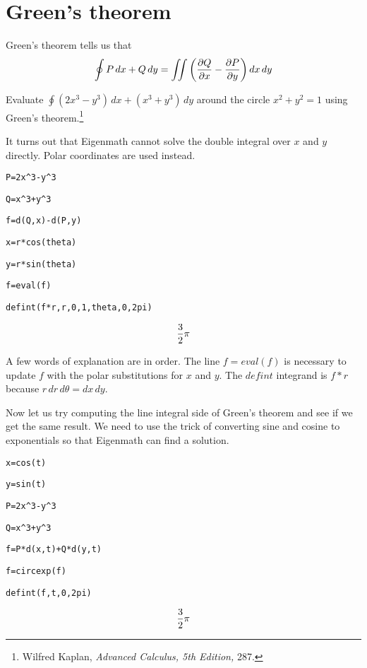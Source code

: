 \section*{Green's theorem}
Green's theorem tells us that
$$\oint P\,dx+Q\,dy=\int\!\!\!\int
\left({\partial Q\over\partial x}-{\partial P\over\partial y}\right)
dx\,dy$$

\noindent
Evaluate $\oint (2x^3-y^3)\,dx+(x^3+y^3)\,dy$ around the circle
$x^2+y^2=1$ using Green's theorem.\footnote{
Wilfred Kaplan, {\it Advanced Calculus, 5th Edition,} 287.}

\medskip
\noindent
It turns out that Eigenmath cannot solve the double integral over
$x$ and $y$ directly.
Polar coordinates are used instead.

\medskip
\verb$P=2x^3-y^3$

\verb$Q=x^3+y^3$

\verb$f=d(Q,x)-d(P,y)$

\verb$x=r*cos(theta)$

\verb$y=r*sin(theta)$

\verb$f=eval(f)$

\verb$defint(f*r,r,0,1,theta,0,2pi)$

$${3\over2}\pi$$

\medskip
\noindent
A few words of explanation are in order.
The line $f=eval(f)$ is necessary to update $f$ with the polar
substitutions for
$x$ and $y$.
The $defint$ integrand is $f{*}r$ because $r\,dr\,d\theta=dx\,dy$.

\medskip
\noindent
Now let us try computing the line integral side of Green's theorem
and see if we get the same result.
We need to use the trick of converting sine and cosine to exponentials
so that Eigenmath can find a solution.

\medskip
\verb$x=cos(t)$

\verb$y=sin(t)$

\verb$P=2x^3-y^3$

\verb$Q=x^3+y^3$

\verb$f=P*d(x,t)+Q*d(y,t)$

\verb$f=circexp(f)$

\verb$defint(f,t,0,2pi)$

$${3\over2}\pi$$

